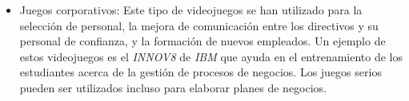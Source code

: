 \begin{itemize}
\item Juegos corporativos: Este tipo de videojuegos se han utilizado para la
    selección de personal, la mejora de comunicación entre los directivos y su
    personal de confianza, y la formación de nuevos empleados. Un ejemplo de
    estos videojuegos es el \emph{INNOV8} de \emph{IBM} que ayuda en el entrenamiento de los
    estudiantes acerca de la gestión de procesos de negocios. Los juegos serios
    pueden ser utilizados incluso para elaborar planes de
    negocios\cite{education:games}. 

\end{itemize}
